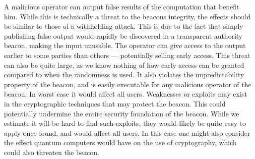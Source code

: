  A malicious operator can output false results of the computation that benefit him. While this is technically a threat to the beacons integrity, the effects should be similar to those of a withholding attack. This is due to the fact that simply publishing false output would rapidly be discovered in a transparent authority beacon, making the input unusable.
 The operator can give access to the output earlier to some parties than others --- potentially selling early access. This threat can also be quite large, as we know nothing of how early access can be granted compared to when the randomness is used. It also violates the unpredictability property of the beacon, and is easily executable for any malicious operator of the beacon. In worst case it would affect all users.
 Weaknesses or exploits may exist in the cryptographic techniques that may protect the beacon. This could potentially undermine the entire security foundation of the beacon. While we estimate it will be hard to find such exploits, they would likely be quite easy to apply once found, and would affect all users. In this case one might also consider the effect quantum computers would have on the use of cryptography, which could also threaten the beacon.
